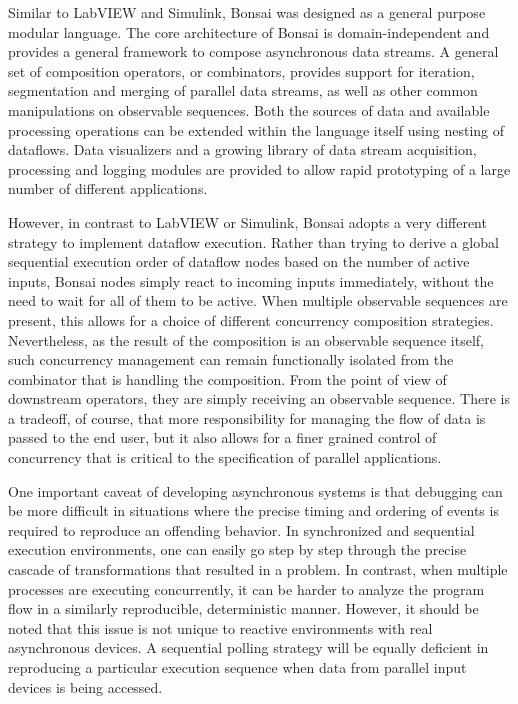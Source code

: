 Similar to LabVIEW and Simulink, Bonsai was designed as a general purpose modular language. The core architecture of Bonsai is domain-independent and provides a general framework to compose asynchronous data streams. A general set of composition operators, or combinators, provides support for iteration, segmentation and merging of parallel data streams, as well as other common manipulations on observable sequences. Both the sources of data and available processing operations can be extended within the language itself using nesting of dataflows. Data visualizers and a growing library of data stream acquisition, processing and logging modules are provided to allow rapid prototyping of a large number of different applications.

However, in contrast to LabVIEW or Simulink, Bonsai adopts a very different strategy to implement dataflow execution. Rather than trying to derive a global sequential execution order of dataflow nodes based on the number of active inputs, Bonsai nodes simply react to incoming inputs immediately, without the need to wait for all of them to be active. When multiple observable sequences are present, this allows for a choice of different concurrency composition strategies. Nevertheless, as the result of the composition is an observable sequence itself, such concurrency management can remain functionally isolated from the combinator that is handling the composition. From the point of view of downstream operators, they are simply receiving an observable sequence. There is a tradeoff, of course, that more responsibility for managing the flow of data is passed to the end user, but it also allows for a finer grained control of concurrency that is critical to the specification of parallel applications.

One important caveat of developing asynchronous systems is that debugging can be more difficult in situations where the precise timing and ordering of events is required to reproduce an offending behavior. In synchronized and sequential execution environments, one can easily go step by step through the precise cascade of transformations that resulted in a problem. In contrast, when multiple processes are executing concurrently, it can be harder to analyze the program flow in a similarly reproducible, deterministic manner. However, it should be noted that this issue is not unique to reactive environments with real asynchronous devices. A sequential polling strategy will be equally deficient in reproducing a particular execution sequence when data from parallel input devices is being accessed.

